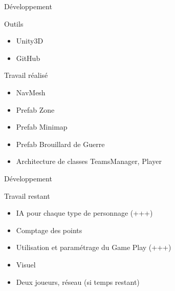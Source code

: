 \documentclass[10pt]{beamer}
\begin{document}
\begin{frame}{D\'eveloppement}

\begin{block}{Outils}
\begin{itemize}
\item  Unity3D
\item GitHub
\end{itemize}
\end{block}

\begin{block}{Travail r\'ealis\'e}
\begin{itemize}
\item NavMesh
 \item Prefab Zone
 \item Prefab Minimap
 \item Prefab Brouillard de Guerre
 \item Architecture de classes TeamsManager, Player
\end{itemize}
\end{block}
\end{frame}

\begin{frame}{D\'eveloppement}
\begin{block}{Travail restant}
\begin{itemize}
 \item IA pour chaque type de personnage (+++)
 \item Comptage des points
 \item Utilisation et param\'etrage du Game Play (+++)
 \item Visuel
 \item Deux joueurs, r\'eseau (si temps restant)
\end{itemize}
\end{block}

\end{frame}
\end{document}
